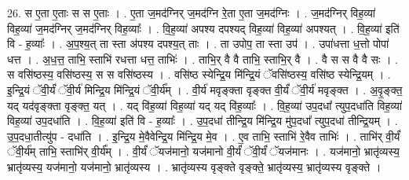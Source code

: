 \documentclass[17pt]{extarticle}
\begin{document}
26. स ए॒ता ए॒ताः स स ए॒ताः । . ए॒ता ज॒मद॑ग्निर् ज॒मद॑ग्नि रे॒ता ए॒ता ज॒मद॑ग्निः । . ज॒मद॑ग्निर् विह॒व्या॑ विह॒व्या॑ ज॒मद॑ग्निर् ज॒मद॑ग्निर् विह॒व्याः᳚ । . वि॒ह॒व्या॑ अपश्य दपश्यद् विह॒व्या॑ विह॒व्या॑ अपश्यत् । . वि॒ह॒व्या॑ इति॑ वि - ह॒व्याः᳚ । . अ॒प॒श्य॒त् ता स्ता अ॑पश्य दपश्य॒त् ताः । . ता उपोप॒ ता स्ता उप॑ । . उपा॑धत्ता ध॒त्तो पोपा॑ धत्त । . अ॒ध॒त्त॒ ताभि॒ स्ताभि॑ रधत्ता धत्त॒ ताभिः॑ । . ताभि॒र् वै वै ताभि॒ स्ताभि॒र् वै । . वै स स वै वै सः । . स वसि॑ष्ठस्य॒ वसि॑ष्ठस्य॒ स स वसि॑ष्ठस्य । . वसि॑ष्ठ स्येन्द्रि॒य मि॑न्द्रि॒यं ॅवसि॑ष्ठस्य॒ वसि॑ष्ठ स्येन्द्रि॒यम् । . इ॒न्द्रि॒यं ॅवी॒र्यं॑ ॅवी॒र्य॑ मिन्द्रि॒य मि॑न्द्रि॒यं ॅवी॒र्य᳚म् । . वी॒र्य॑ मवृङ्क्ता वृङ्क्त वी॒र्यं॑ ॅवी॒र्य॑ मवृङ्क्त । . अ॒वृ॒ङ्क्त॒ यद् यद॑वृङ्क्ता वृङ्क्त॒ यत् । . यद् वि॑ह॒व्या॑ विह॒व्या॑ यद् यद् वि॑ह॒व्याः᳚ । . वि॒ह॒व्या॑ उप॒दधा᳚ त्युप॒दधा॑ति विह॒व्या॑ विह॒व्या॑ उप॒दधा॑ति । . वि॒ह॒व्या॑ इति॑ वि - ह॒व्याः᳚ । . उ॒प॒दधा॑ तीन्द्रि॒य मि॑न्द्रि॒य मु॑प॒दधा᳚ त्युप॒दधा॑ तीन्द्रि॒यम् । . उ॒प॒दधा॒तीत्यु॑प - दधा॑ति । . इ॒न्द्रि॒य मे॒वैवेन्द्रि॒य मि॑न्द्रि॒य मे॒व । . ए॒व ताभि॒ स्ताभि॑ रे॒वैव ताभिः॑ । . ताभि॑र् वी॒र्यं॑ ॅवी॒र्य॑म् ताभि॒ स्ताभि॑र् वी॒र्य᳚म् । . वी॒र्यं॑ ॅयज॑मानो॒ यज॑मानो वी॒र्यं॑ ॅवी॒र्यं॑ ॅयज॑मानः । . यज॑मानो॒ भ्रातृ॑व्यस्य॒ भ्रातृ॑व्यस्य॒ यज॑मानो॒ यज॑मानो॒ भ्रातृ॑व्यस्य । . भ्रातृ॑व्यस्य वृङ्क्ते वृङ्क्ते॒ भ्रातृ॑व्यस्य॒ भ्रातृ॑व्यस्य वृङ्क्ते । \newline
\end{document}
